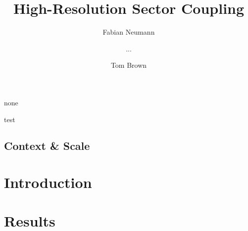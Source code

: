\documentclass[11pt,1p]{elsarticle}
\begin{document}
\begin{frontmatter}

	\title{High-Resolution Sector Coupling}
	
	\author[tubaddress]{Fabian Neumann}
	\author{...}
	\author[tubaddress]{Tom Brown}
	\address[tubaddress]{Department of Digital Transformation in Energy Systems, Institute of Energy Technology, Technische Universität Berlin, Fakultät III, Einsteinufer 25 (TA 8), 10587 Berlin, Germany}

	\begin{abstract}
		 
	\end{abstract}

	\begin{keyword}
		none
	\end{keyword}

	\begin{graphicalabstract}
	\end{graphicalabstract}

	\begin{highlights}
		\item test
	\end{highlights}

\end{frontmatter}




\begin{shaded}
\vspace{-0.5cm}
\section*{Context \& Scale}

\end{shaded}
 
\section*{Introduction}
\label{sec:intro}



\section*{Results}
\label{sec:results}
\end{document}
